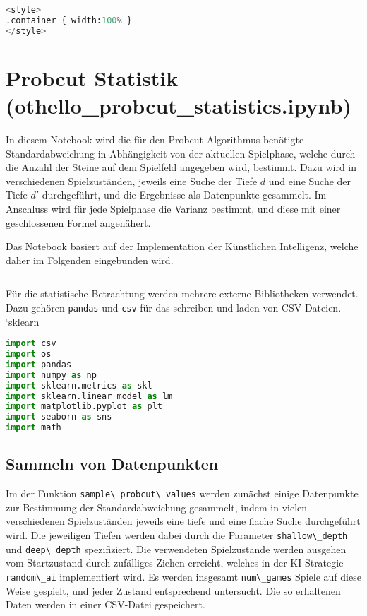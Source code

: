 \begin{lstlisting}[language=Python]
%%HTML
<style>
.container { width:100% }
</style>
\end{lstlisting}

\hypertarget{probcut-statistik-othello_probcut_statistics.ipynb}{%
\section{Probcut Statistik
(othello\_probcut\_statistics.ipynb)}\label{probcut-statistik-othello_probcut_statistics.ipynb}}

In diesem Notebook wird die für den Probcut Algorithmus benötigte
Standardabweichung in Abhängigkeit von der aktuellen Spielphase, welche
durch die Anzahl der Steine auf dem Spielfeld angegeben wird, bestimmt.
Dazu wird in verschiedenen Spielzuständen, jeweils eine Suche der Tiefe
\(d\) und eine Suche der Tiefe \(d'\) durchgeführt, und die Ergebnisse
als Datenpunkte gesammelt. Im Anschluss wird für jede Spielphase die
Varianz bestimmt, und diese mit einer geschlossenen Formel angenähert.

Das Notebook basiert auf der Implementation der Künstlichen Intelligenz,
welche daher im Folgenden eingebunden wird.

\begin{lstlisting}[language=Python]
%run othello_ai.ipynb
\end{lstlisting}

Für die statistische Betrachtung werden mehrere externe Bibliotheken
verwendet. Dazu gehören \passthrough{\lstinline!pandas!} und
\passthrough{\lstinline!csv!} für das schreiben und laden von
CSV-Dateien. `sklearn

\begin{lstlisting}[language=Python]
import csv
import os
import pandas
import numpy as np
import sklearn.metrics as skl
import sklearn.linear_model as lm
import matplotlib.pyplot as plt
import seaborn as sns
import math
\end{lstlisting}

\hypertarget{sammeln-von-datenpunkten}{%
\subsection{Sammeln von Datenpunkten}\label{sammeln-von-datenpunkten}}

Im der Funktion \passthrough{\lstinline!sample\_probcut\_values!} werden
zunächst einige Datenpunkte zur Bestimmung der Standardabweichung
gesammelt, indem in vielen verschiedenen Spielzuständen jeweils eine
tiefe und eine flache Suche durchgeführt wird. Die jeweiligen Tiefen
werden dabei durch die Parameter
\passthrough{\lstinline!shallow\_depth!} und
\passthrough{\lstinline!deep\_depth!} spezifiziert. Die verwendeten
Spielzustände werden ausgehen vom Startzustand durch zufälliges Ziehen
erreicht, welches in der KI Strategie
\passthrough{\lstinline!random\_ai!} implementiert wird. Es werden
insgesamt \passthrough{\lstinline!num\_games!} Spiele auf diese Weise
gespielt, und jeder Zustand entsprechend untersucht. Die so erhaltenen
Daten werden in einer CSV-Datei gespeichert.

